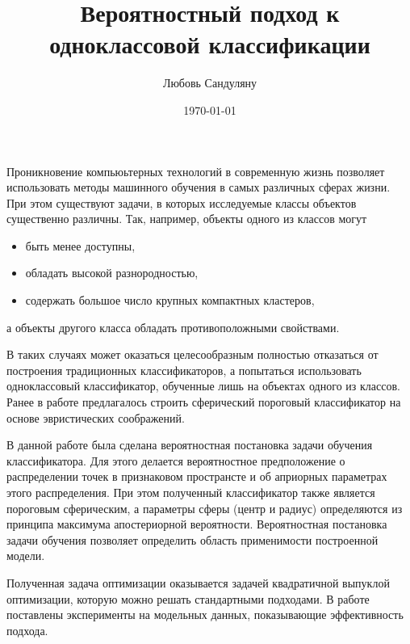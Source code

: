 \documentclass[12pt,a4paper,oneside]{article}
\begin{document}
    \title{Вероятностный подход к одноклассовой классификации}
    \author{Любовь Сандуляну}
	\date{\today}
	\maketitle

Проникновение компьюьтерных технологий в современную жизнь позволяет использовать методы машинного обучения в самых различных сферах жизни. При этом существуют задачи, в которых исследуемые классы объектов существенно различны. Так, например, объекты одного из классов могут
\begin{itemize}
    	\item быть менее доступны,
		\item обладать высокой разнородностью,
		\item содержать большое число крупных компактных кластеров,
\end{itemize}
а объекты другого класса обладать противоположными свойствами. 

В таких случаях может оказаться целесообразным полностью отказаться от построения традиционных классификаторов, а попытаться использовать одноклассовый классификатор, обученные лишь на объектах одного из классов. Ранее в работе \cite{Tax2001} предлагалось строить сферический пороговый классификатор на основе эвристических соображений. 

В данной работе \cite{JMLDA2012no4} была сделана вероятностная постановка задачи обучения классификатора. Для этого делается вероятностное предположение о распределении точек в признаковом пространсте и об априорных параметрах этого распределения. 
При этом полученный классификатор также является пороговым сферическим, а параметры сферы (центр и радиус) определяются из принципа максимума апостериорной вероятности. Вероятностная постановка задачи обучения позволяет определить область применимости построенной модели.

Полученная задача оптимизации оказывается задачей квадратичной выпуклой оптимизации, которую можно решать стандартными подходами. В работе поставлены эксперименты на модельных
данных, показывающие эффективность подхода.

%
\end{document}

